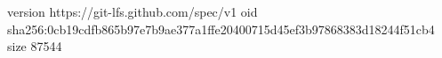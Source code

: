 version https://git-lfs.github.com/spec/v1
oid sha256:0cb19cdfb865b97e7b9ae377a1ffe20400715d45ef3b97868383d18244f51cb4
size 87544
